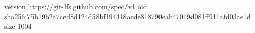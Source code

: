 version https://git-lfs.github.com/spec/v1
oid sha256:75b19b2a7ced8d124d58bf194418aede818790eab47019d081ff911afd03ae1d
size 1004
